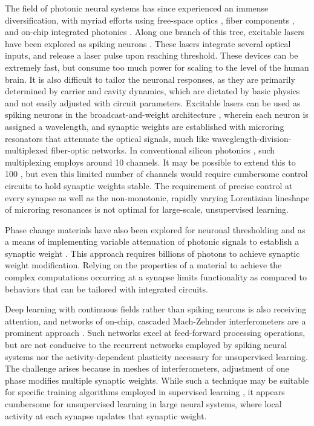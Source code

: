 \documentclass[twocolumn]{article}
\begin{document}
The field of photonic neural systems has since experienced an immense diversification, with myriad efforts using free-space optics \cite{habe2019}, fiber components \cite{prsh2017}, and on-chip integrated photonics \cite{shha2016,vame2014,tafe2019}. Along one branch of this tree, excitable lasers have been explored as spiking neurons \cite{prsh2017}. These lasers integrate several optical inputs, and release a laser pulse upon reaching threshold. These devices can be extremely fast, but consume too much power for scaling to the level of the human brain. It is also difficult to tailor the neuronal responses, as they are primarily determined by carrier and cavity dynamics, which are dictated by basic physics and not easily adjusted with circuit parameters. Excitable lasers can be used as spiking neurons in the broadcast-and-weight architecture \cite{tana20142}, wherein each neuron is assigned a wavelength, and synaptic weights are established with microring resonators that attenuate the optical signals, much like waveglength-division-multiplexed fiber-optic networks. In conventional silicon photonics \cite{li2005}, such multiplexing employs around 10 channels. It may be possible to extend this to 100 \cite{prsh2011,tana20142}, but even this limited number of channels would require cumbersome control circuits to hold synaptic weights stable. The requirement of precise control at every synapse as well as the non-monotonic, rapidly varying Lorentizian lineshape of microring resonances is not optimal for large-scale, unsupervised learning. 

Phase change materials have also been explored for neuronal thresholding \cite{chsa2018} and as a means of implementing variable attenuation of photonic signals to establish a synaptic weight \cite{chri2017}. This approach requires billions of photons to achieve synaptic weight modification. Relying on the properties of a material to achieve the complex computations occurring at a synapse limits functionality as compared to behaviors that can be tailored with integrated circuits. 

Deep learning with continuous fields rather than spiking neurons is also receiving attention, and networks of on-chip, cascaded Mach-Zehnder interferometers are a prominent approach \cite{shha2016}. Such networks excel at feed-forward processing operations, but are not conducive to the recurrent networks employed by spiking neural systems nor the activity-dependent plasticity necessary for unsupervised learning. The challenge arises because in meshes of interferometers, adjustment of one phase modifies multiple synaptic weights. While such a technique may be suitable for specific training algorithms employed in supervised learning \cite{humi2018}, it appears cumbersome for unsupervised learning in large neural systems, where local activity at each synapse updates that synaptic weight.
\end{document}
